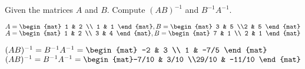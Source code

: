 
\begin{Exercise}[
name={},
title={}, 
difficulty=0,
origin={\cite{GH}}]
Given the matrices $A$ and $B$. Compute $(AB)^{-1}$ and $B^{-1}A^{-1}$.
\begin{multicols}{2}
\Question $A=\begin{mat}  1 & 2 \\ 1 & 1 \end{mat},\\B=\begin{mat} 3 & 5 \\2 & 5 \end{mat}$
\Question $A=\begin{mat}  1 & 2 \\ 3 & 4  \end{mat},\\B=\begin{mat} 7 & 1 \\ 2 & 1 \end{mat}$
\EndCurrentQuestion
\end{multicols}

\end{Exercise}
\begin{Answer}
\Question $(AB)^{-1}=B^{-1}A^{-1}=\begin{mat} -2 & 3 \\ 1 & -7/5 \end{mat}$
\Question $(AB)^{-1}=B^{-1}A^{-1}=\begin{mat}-7/10 & 3/10 \\29/10 & -11/10 \end{mat}$
\end{Answer}
